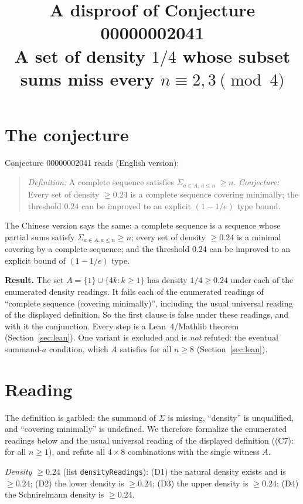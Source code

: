 \documentclass[11pt]{article}
\title{A disproof of Conjecture 00000002041\\[2pt]
\large A set of density $1/4$ whose subset sums miss every $n\equiv2,3 \pmod 4$}
\date{}
\theoremstyle{definition}
\renewcommand{\_}{\oldus\allowbreak}
\begin{document}
\sloppy
\maketitle

\section{The conjecture}

Conjecture 00000002041 reads (English version):
\begin{quote}
\emph{Definition:} A complete sequence satisfies $\Sigma_{a\in A,\,a\le n}\ \ge n$.
\emph{Conjecture:} Every set of density $\ge 0.24$ is a complete sequence covering minimally; the threshold
$0.24$ can be improved to an explicit $(1-1/e)$ type bound.
\end{quote}
The Chinese version says the same: a complete sequence is a sequence whose partial sums satisfy
$\Sigma_{a\in A,a\le n}\ge n$; every set of density $\ge0.24$ is a minimal covering by a complete
sequence; and the threshold $0.24$ can be improved to an explicit bound of $(1-1/e)$ type.

\textbf{Result.} The set $A=\{1\}\cup\{4k:k\ge1\}$ has density $1/4\ge0.24$ under each of the
enumerated density readings. It fails each of the enumerated readings of ``complete sequence (covering
minimally)'', including the usual universal reading of the displayed definition. So the first clause is
false under these readings, and with it the conjunction. Every step is a Lean~4/Mathlib theorem
(Section~\ref{sec:lean}). One variant is excluded and is \emph{not} refuted: the eventual summand-$a$
condition, which $A$ satisfies for all $n\ge8$ (Section~\ref{sec:lean}).

\section{Reading}\label{sec:reading}

The definition is garbled: the summand of $\Sigma$ is missing, ``density'' is unqualified, and
``covering minimally'' is undefined. We therefore formalize the enumerated readings below and the usual
universal reading of the displayed definition ((C7): for all $n\ge1$), and refute all $4\times 8$
combinations with the single witness $A$.

\emph{Density $\ge 0.24$} (list \texttt{densityReadings}):
(D1) the natural density exists and is $\ge0.24$; (D2) the lower density is $\ge0.24$; (D3) the upper
density is $\ge0.24$; (D4) the Schnirelmann density is $\ge0.24$.
\end{document}
